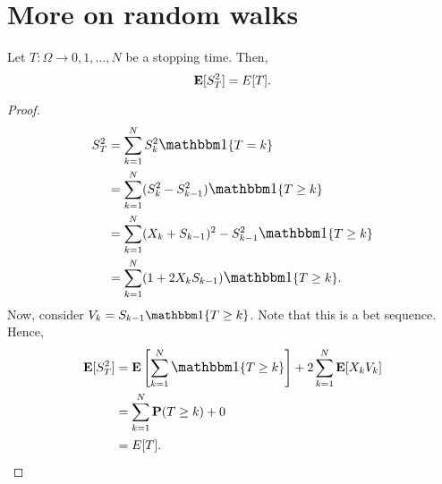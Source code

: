 \documentclass[main]{subfiles}
\begin{document}
\setcounter{chapter}{1} %
\chapter{More on random walks} %
\setcounter{section}{0}


\begin{theorem}
    Let $T:\Omega\rightarrow{0,1,\ldots,N}$ be a stopping time. Then,
    $$\mathbf E[S_T^2]=E[T].$$
\end{theorem}
\begin{proof}
    $$
        \begin{aligned}
            S_T^2 & =\sum_{k=1}^N S_k^2 \one\{T=k\}                         \\
                  & =\sum_{k=1}^N (S_k^2-S_{k-1}^2) \one\{T\geq k\}         \\
                  & =\sum_{k=1}^N (X_k+S_{k-1})^2-S_{k-1}^2 \one\{T\geq k\} \\
                  & =\sum_{k=1}^N (1+2X_kS_{k-1}) \one\{T\geq k\}.          \\
        \end{aligned}
    $$
    Now, consider $V_k=S_{k-1} \one\{T\geq k\}$. Note that this is a bet sequence. Hence,
    $$
        \begin{aligned}
            \E[S_T^2] & =\E\left[\sum_{k=1}^N\one\{T\geq k\}\right]+2\sum_{k=1}^N\E[X_k V_k] \\
                      & =\sum_{k=1}^N \P(T\geq k)+0                                          \\
                      & =E[T].
        \end{aligned}
    $$
\end{proof}
\end{document}
